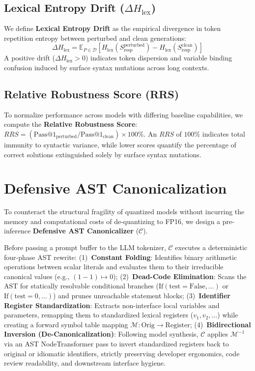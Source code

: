 \documentclass[11pt,twocolumn]{article}
\begin{document}
\subsection{Lexical Entropy Drift (\texorpdfstring{$\Delta H_{\text{lex}}$}{Delta H_lex})}
We define \textbf{Lexical Entropy Drift} as the empirical divergence in token repetition entropy between perturbed and clean generations:
\begin{equation}
    \Delta H_{\text{lex}} = \mathbb{E}_{P \in \mathcal{D}} \left[ H_{\text{lex}}(S_{\text{resp}}^{\text{perturbed}}) - H_{\text{lex}}(S_{\text{resp}}^{\text{clean}}) \right]
\end{equation}
A positive drift ($\Delta H_{\text{lex}} > 0$) indicates token dispersion and variable binding confusion induced by surface syntax mutations across long contexts.

\subsection{Relative Robustness Score (RRS)}
To normalize performance across models with differing baseline capabilities, we compute the \textbf{Relative Robustness Score}: $RRS = (\text{Pass@1}_{\text{perturbed}} / \text{Pass@1}_{\text{clean}}) \times 100\%$. An $RRS$ of $100\%$ indicates total immunity to syntactic variance, while lower scores quantify the percentage of correct solutions extinguished solely by surface syntax mutations.

\section{Defensive AST Canonicalization}
\label{sec:defense}

To counteract the structural fragility of quantized models without incurring the memory and computational costs of de-quantizing to FP16, we design a pre-inference \textbf{Defensive AST Canonicalizer} ($\mathcal{C}$).

Before passing a prompt buffer to the LLM tokenizer, $\mathcal{C}$ executes a deterministic four-phase AST rewrite: (1)~\textbf{Constant Folding}: Identifies binary arithmetic operations between scalar literals and evaluates them to their irreducible canonical values (e.g., $(1 - 1) \mapsto 0$); (2)~\textbf{Dead-Code Elimination}: Scans the AST for statically resolvable conditional branches ($\text{If}(\text{test}=\text{False}, \dots)$ or $\text{If}(\text{test}=0, \dots)$) and prunes unreachable statement blocks; (3)~\textbf{Identifier Register Standardization}: Extracts non-interface local variables and parameters, remapping them to standardized lexical registers ($v_1, v_2, \dots$) while creating a forward symbol table mapping $\mathcal{M}: \text{Orig} \to \text{Register}$; (4)~\textbf{Bidirectional Inversion (De-Canonicalization)}: Following model synthesis, $\mathcal{C}$ applies $\mathcal{M}^{-1}$ via an AST NodeTransformer pass to invert standardized registers back to original or idiomatic identifiers, strictly preserving developer ergonomics, code review readability, and downstream interface hygiene.
\end{document}
